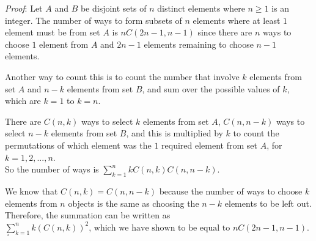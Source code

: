 \documentclass[12pt]{amsart}
\theoremstyle{definition}
\theoremstyle{remark}
\begin{document}
\bigskip
\bigskip

\emph{Proof}: Let $A$ and $B$ be disjoint sets of $n$ distinct elements where $n\geq 1$ is an integer.
The number of ways to form subsets of $n$ elements where at least $1$ element must be from set $A$ is $nC(2n-1,n-1)$ since there are $n$ ways to choose $1$ element from $A$ and $2n-1$ elements remaining to choose $n-1$ elements.

Another way to count this is to count the number that involve $k$ elements from set $A$ and $n-k$ elements from set $B$, and sum over the possible values of $k$, which are $k=1$ to $k=n$.

There are $C(n, k)$ ways to select $k$ elements from set $A$, $C(n, n-k)$ ways to select $n-k$ elements from set $B$, and this is multiplied by $k$ to count the permutations of which element was the $1$ required element from set $A$, for $k=1, 2,..., n$. \\
So the number of ways is $\displaystyle \sum_{k=1}^n kC(n,k)C(n, n-k)$.

We know that $C(n,k)=C(n,n-k)$ because the number of ways to choose $k$ elements from $n$ objects is the same as choosing the $n-k$ elements to be left out.
Therefore, the summation can be written as $\displaystyle \sum_{k=1}^n k(C(n,k))^2 \mbox{, which we have shown to be equal to } nC(2n-1,n-1)$. $\;_{\square}$ \\
\end{document}

